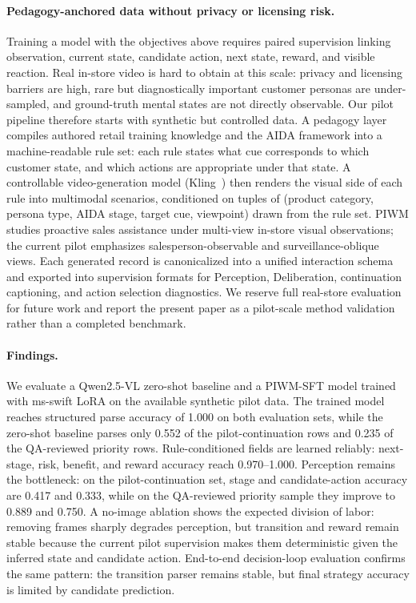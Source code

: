 \documentclass{article}
\begin{document}
\paragraph{Pedagogy-anchored data without privacy or licensing risk.}
Training a model with the objectives above requires paired supervision linking observation, current state, candidate action, next state, reward, and visible reaction. Real in-store video is hard to obtain at this scale: privacy and licensing barriers are high, rare but diagnostically important customer personas are under-sampled, and ground-truth mental states are not directly observable. Our pilot pipeline therefore starts with synthetic but controlled data. A pedagogy layer compiles authored retail training knowledge and the AIDA framework into a machine-readable rule set: each rule states what cue corresponds to which customer state, and which actions are appropriate under that state. A controllable video-generation model (Kling~\cite{Kling}) then renders the visual side of each rule into multimodal scenarios, conditioned on tuples of (product category, persona type, AIDA stage, target cue, viewpoint) drawn from the rule set. PIWM studies proactive sales assistance under multi-view in-store visual observations; the current pilot emphasizes salesperson-observable and surveillance-oblique views. Each generated record is canonicalized into a unified interaction schema and exported into supervision formats for Perception, Deliberation, continuation captioning, and action selection diagnostics. We reserve full real-store evaluation for future work and report the present paper as a pilot-scale method validation rather than a completed benchmark.

\paragraph{Findings.}
We evaluate a Qwen2.5-VL zero-shot baseline and a PIWM-SFT model trained with ms-swift LoRA on the available synthetic pilot data. The trained model reaches structured parse accuracy of 1.000 on both evaluation sets, while the zero-shot baseline parses only 0.552 of the pilot-continuation rows and 0.235 of the QA-reviewed priority rows. Rule-conditioned fields are learned reliably: next-stage, risk, benefit, and reward accuracy reach 0.970--1.000. Perception remains the bottleneck: on the pilot-continuation set, stage and candidate-action accuracy are 0.417 and 0.333, while on the QA-reviewed priority sample they improve to 0.889 and 0.750. A no-image ablation shows the expected division of labor: removing frames sharply degrades perception, but transition and reward remain stable because the current pilot supervision makes them deterministic given the inferred state and candidate action. End-to-end decision-loop evaluation confirms the same pattern: the transition parser remains stable, but final strategy accuracy is limited by candidate prediction.
\end{document}
